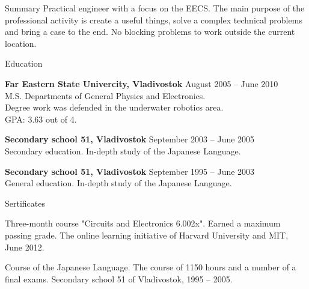 \documentclass{template}
\begin{document}

\begin{rSection}{Summary}
Practical engineer with a focus on the EECS. The main purpose of the professional activity is create a useful things, solve a complex technical problems and bring a case to the end. No blocking problems to work outside the current location.
\end{rSection}


\begin{rSection}{Education}

{\bf Far Eastern State Univercity, Vladivostok} \hfill {August 2005 -- June 2010} \\ 
M.S. Departments of General Physics and Electronics. \\
Degree work was defended in the underwater robotics area. \\
GPA: 3.63 out of 4.

{\bf Secondary school 51, Vladivostok} \hfill {September 2003 -- June 2005} \\
Secondary education. In-depth study of the Japanese Language.

{\bf Secondary school 51, Vladivostok} \hfill {September 1995 -- June 2003} \\
General education. In-depth study of the Japanese Language.

\end{rSection}


\begin{rSection}{Sertificates}

\begin{rItemize}
\item Three-month course "Circuits and Electronics 6.002x". Earned a maximum passing grade. The online learning initiative of Harvard University and MIT, June 2012.
\item Course of the Japanese Language. The course of 1150 hours and a number of a final exams. Secondary school 51 of Vladivostok, 1995 -- 2005.
\end{rItemize}

\end{rSection}
\end{document}
